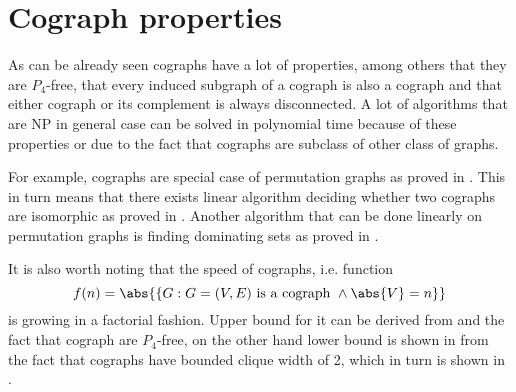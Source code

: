 
\section{Cograph properties}

As can be already seen cographs have a lot of properties, among others that they are $P_4$-free, that every induced subgraph of a cograph is also a cograph and that either cograph or its complement is always disconnected. A lot of algorithms that are NP in general case can be solved in polynomial time because of these properties or due to the fact that cographs are subclass of other class of graphs.

For example, cographs are special case of permutation graphs as proved in \cite{bose}. This in turn means that there exists linear algorithm deciding whether two cographs are isomorphic as proved in \cite{colbourn}. Another algorithm that can be done linearly on permutation graphs is finding dominating sets as proved in \cite{chao}.

It is also worth noting that the speed of cographs, i.e. function
\[
    f(n) = \abs{\{G : G = (V,E) \text{ is a cograph } \land \abs{V} = n\}}
\]
is growing in a factorial fashion. Upper bound for it can be derived from \cite{lozin} and the fact that cograph are $P_4$-free, on the other hand lower bound is shown in \cite{allen} from the fact that cographs have bounded clique width of 2, which in turn is shown in \cite{courcelle}.